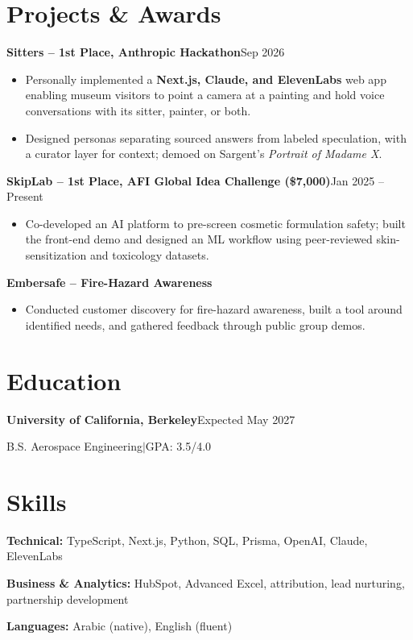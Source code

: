 \documentclass[a4paper,10pt]{article}
\newcommand{\project}[2]{\textbf{#1}\hfill #2\par}
\begin{document}
\section{Projects \& Awards}
\project{Sitters -- 1st Place, Anthropic Hackathon}{Sep 2026}
\begin{itemize}
  \item Personally implemented a \textbf{Next.js, Claude, and ElevenLabs} web app enabling museum visitors to point a camera at a painting and hold voice conversations with its sitter, painter, or both.
  \item Designed personas separating sourced answers from labeled speculation, with a curator layer for context; demoed on Sargent's \textit{Portrait of Madame X}.
\end{itemize}
\project{SkipLab -- 1st Place, AFI Global Idea Challenge (\$7,000)}{Jan 2025 -- Present}
\begin{itemize}
  \item Co-developed an AI platform to pre-screen cosmetic formulation safety; built the front-end demo and designed an ML workflow using peer-reviewed skin-sensitization and toxicology datasets.
\end{itemize}
\project{Embersafe -- Fire-Hazard Awareness}{}
\begin{itemize}
  \item Conducted customer discovery for fire-hazard awareness, built a tool around identified needs, and gathered feedback through public group demos.
\end{itemize}

\section{Education}
\textbf{University of California, Berkeley}\hfill Expected May 2027\par
B.S. Aerospace Engineering\enspace$|$\enspace GPA: 3.5/4.0\par

\section{Skills}
\textbf{Technical:} TypeScript, Next.js, Python, SQL, Prisma, OpenAI, Claude, ElevenLabs\par
\textbf{Business \& Analytics:} HubSpot, Advanced Excel, attribution, lead nurturing, partnership development\par
\textbf{Languages:} Arabic (native), English (fluent)
\end{document}
